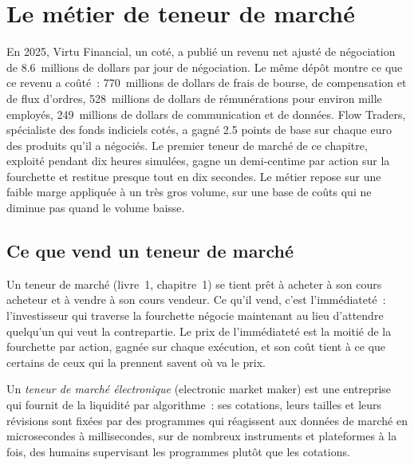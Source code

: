 \chapter{Le métier de teneur de marché}\label{ch:hf:the-business-of-market-making}

En 2025, Virtu Financial, un  coté, a publié un revenu net ajusté de négociation de 8.6~millions de dollars par jour de négociation. Le même dépôt montre
ce que ce revenu a coûté~: 770~millions de dollars de frais de bourse, de compensation et de flux d'ordres, 528~millions de dollars de rémunérations pour environ mille employés, 249~millions de dollars de
communication et de données. Flow Traders, spécialiste des fonds indiciels cotés, a gagné 2.5 points de base sur chaque euro des produits qu'il a négociés. Le
premier teneur de marché de ce chapitre, exploité pendant dix heures simulées, gagne un demi-centime par action sur la fourchette et restitue presque tout en dix secondes. Le
métier repose sur une faible marge appliquée à un très gros volume, sur une base de coûts qui ne diminue pas quand le volume baisse.

\section{Ce que vend un teneur de marché}

Un teneur de marché (livre~1, chapitre~1) se tient prêt à acheter à son cours acheteur et à vendre à son cours vendeur. Ce qu'il vend, c'est l'immédiateté~: l'investisseur qui
traverse la fourchette négocie maintenant au lieu d'attendre quelqu'un qui veut la contrepartie. Le prix de l'immédiateté est la moitié de la fourchette par action, gagnée
sur chaque exécution, et son coût tient à ce que certains de ceux qui la prennent savent où va le prix.

\begin{definition}\label{def:hf:the-business-of-market-making:emm}
Un \emph{teneur de marché électronique} (electronic market maker) est une entreprise qui fournit de la liquidité par algorithme~: ses cotations, leurs tailles et leurs
révisions sont fixées par des programmes qui réagissent aux données de marché en microsecondes à millisecondes, sur de nombreux instruments et plateformes à la fois, des humains
supervisant les programmes plutôt que les cotations.
\end{definition}

